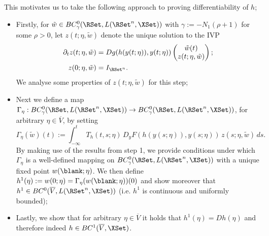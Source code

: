 \documentclass[a4paper]{siamart190516}
\begin{document}
This motivates us to take the following approach to proving differentiability of $h$; 
 \begin{itemize}
 \vspace{0.2cm}
 \item[\underline{\bf{Step 1}}]  Firstly, for $\tilde{w} \in BC^0_{\gamma}(\RSet, L(\RSet^n, \XSet))$ with $\gamma := -N_1(\rho+1)$ for some $\rho > 0$, let $z(t;\eta,\tilde{w})$ denote the unique solution to the IVP
\begin{equation}\label{eq:var-eqn-z}
 \begin{aligned}
 \partial_t z(t;\eta,\tilde{w}) &=  D g(h(y(t;\eta)), y(t;\eta)) \begin{pmatrix} \tilde{w}(t)  \\ z(t;\eta, \tilde{w}) \end{pmatrix} ; \\
z(0;\eta, \tilde{w}) &=  I_{\RSet^n}.
 \end{aligned}
 \end{equation}
 We analyse some properties of $z(t;\eta,\tilde{w})$ for this step; 
  \item[\underline{\bf{Step 2}}]  Next we define a map $\Gamma_{\eta}: BC^0_{\gamma}(\RSet, L(\RSet^n, \XSet)) \rightarrow BC^0_{\gamma}(\RSet, L(\RSet^n, \XSet))$, for arbitrary $\eta \in \overline{V}$, by setting
\begin{equation}\label{eq:map-Gamma}
 \Gamma_{\eta}(\tilde{w})(t) := \int_{-\infty}^t T_h(t,s;\eta) \, D_y F(h(y(s;\eta)),y(s;\eta)) \, z(s;\eta,\tilde{w}) \, ds.
 \end{equation}
By making use of the results from step 1, we provide conditions under which $\Gamma_{\eta}$ is a well-defined mapping on $BC^0_{\gamma}(\RSet, L(\RSet^n, \XSet))$ with a unique fixed point $w(\blank;\eta)$. We then define $h^1(\eta) := w(0; \eta) = \Gamma_{\eta}(w(\blank; \eta))(0)$ and show moreover that $h^1 \in BC^{0}(\overline{V}, L(\RSet^n,\XSet))$ (i.e. $h^1$ is continuous and uniformly bounded);
  \item[\underline{\bf{Step 3}}]  Lastly, we show that for arbitrary $\eta \in \overline{V}$ it holds that $h^1(\eta) = Dh(\eta)$ and therefore indeed $h \in BC^1(\overline{V},\XSet)$.
 \end{itemize}
  \vspace{0.2cm}
  
\end{document}
